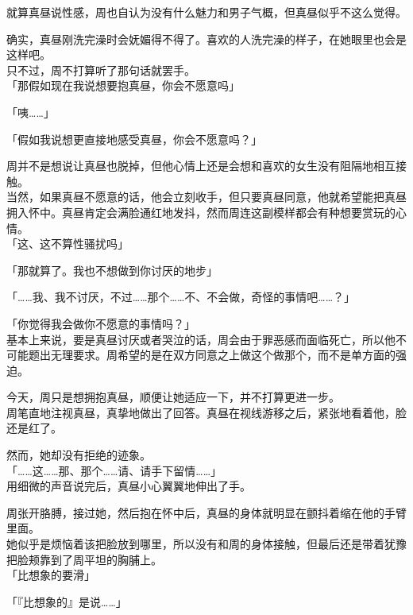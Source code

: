 就算真昼说性感，周也自认为没有什么魅力和男子气概，但真昼似乎不这么觉得。

确实，真昼刚洗完澡时会妩媚得不得了。喜欢的人洗完澡的样子，在她眼里也会是这样吧。\\

只不过，周不打算听了那句话就罢手。\\

「那假如现在我说想要抱真昼，你会不愿意吗」

「咦……」

「假如我说想更直接地感受真昼，你会不愿意吗？」

周并不是想说让真昼也脱掉，但他心情上还是会想和喜欢的女生没有阻隔地相互接触。\\

当然，如果真昼不愿意的话，他会立刻收手，但只要真昼同意，他就希望能把真昼拥入怀中。真昼肯定会满脸通红地发抖，然而周连这副模样都会有种想要赏玩的心情。\\

「这、这不算性骚扰吗」

「那就算了。我也不想做到你讨厌的地步」

「……我、我不讨厌，不过……那个……不、不会做，奇怪的事情吧……？」

「你觉得我会做你不愿意的事情吗？」\\

基本上来说，要是真昼讨厌或者哭泣的话，周会由于罪恶感而面临死亡，所以他不可能题出无理要求。周希望的是在双方同意之上做这个做那个，而不是单方面的强迫。

今天，周只是想拥抱真昼，顺便让她适应一下，并不打算更进一步。\\

周笔直地注视真昼，真挚地做出了回答。真昼在视线游移之后，紧张地看着他，脸还是红了。

然而，她却没有拒绝的迹象。\\

「……这……那、那个……请、请手下留情……」\\

用细微的声音说完后，真昼小心翼翼地伸出了手。

周张开胳膊，接过她，然后抱在怀中后，真昼的身体就明显在颤抖着缩在他的手臂里面。\\

她似乎是烦恼着该把脸放到哪里，所以没有和周的身体接触，但最后还是带着犹豫把脸颊靠到了周平坦的胸脯上。\\

「比想象的要滑」

「『比想象的』是说……」

